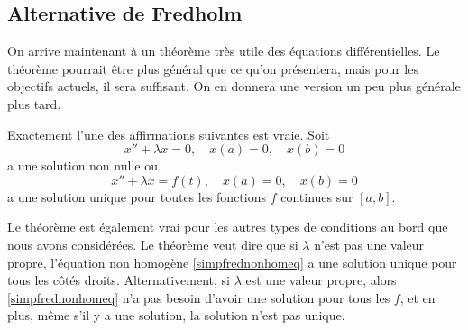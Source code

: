 %



\subsection{Alternative de Fredholm}

On arrive maintenant à un théorème très utile des équations différentielles. Le théorème pourrait être plus général que ce qu'on présentera, mais pour les objectifs actuels, il sera suffisant. On en donnera une version un peu plus générale plus tard.

\begin{theorem}
\label{thm:fredholmsimple}
Exactement l'une des affirmations suivantes est vraie.
Soit
\begin{equation} \label{simpfredhomeq}
x'' + \lambda x = 0, \quad x(a) = 0, \quad x(b) = 0
\end{equation}
a une solution non nulle ou 
\begin{equation} \label{simpfrednonhomeq}
x'' + \lambda x = f(t), \quad x(a) = 0, \quad x(b) = 0
\end{equation}
a une solution unique pour toutes les fonctions $f$ continues sur $[a,b]$.
\end{theorem}

Le théorème est également vrai pour les autres types de
conditions au bord que nous avons considérées.
Le théorème veut dire que si  $\lambda$ n'est pas une valeur propre, l'équation non homogène  \eqref{simpfrednonhomeq} a une solution unique pour tous les côtés droits. Alternativement, si  $\lambda$ est une valeur propre, alors  
\eqref{simpfrednonhomeq} n'a pas besoin d'avoir une solution pour tous les $f$,
et en plus, même s'il y a une solution, la solution n'est pas unique.

